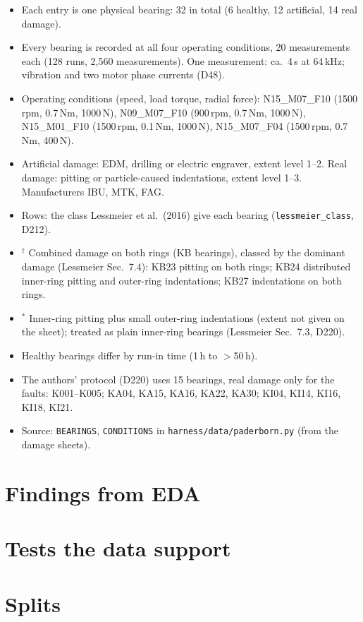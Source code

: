 \documentclass[11pt,a4paper]{article}
\begin{document}
\begin{itemize}
  \item Each entry is one physical bearing: 32 in total (6 healthy, 12 artificial, 14 real damage).
  \item Every bearing is recorded at all four operating conditions, 20 measurements each
        (128 runs, 2,560 measurements). One measurement: ca.\ 4\,s at 64\,kHz; vibration and
        two motor phase currents (D48).
  \item Operating conditions (speed, load torque, radial force):
        N15\_M07\_F10 (1500\,rpm, 0.7\,Nm, 1000\,N), N09\_M07\_F10 (900\,rpm, 0.7\,Nm, 1000\,N),
        N15\_M01\_F10 (1500\,rpm, 0.1\,Nm, 1000\,N), N15\_M07\_F04 (1500\,rpm, 0.7\,Nm, 400\,N).
  \item Artificial damage: EDM, drilling or electric engraver, extent level 1--2.
        Real damage: pitting or particle-caused indentations, extent level 1--3.
        Manufacturers IBU, MTK, FAG.
  \item Rows: the class Lessmeier et al.\ (2016) give each bearing (\texttt{lessmeier\_class}, D212).
  \item $^\dagger$ Combined damage on both rings (KB bearings), classed by the dominant damage
        (Lessmeier Sec.\ 7.4): KB23 pitting on both rings; KB24 distributed inner-ring pitting
        and outer-ring indentations; KB27 indentations on both rings.
  \item $^*$ Inner-ring pitting plus small outer-ring indentations (extent not given on the
        sheet); treated as plain inner-ring bearings (Lessmeier Sec.\ 7.3, D220).
  \item Healthy bearings differ by run-in time (1\,h to $>$50\,h).
  \item The authors' protocol (D220) uses 15 bearings, real damage only for the faults:
        K001--K005; KA04, KA15, KA16, KA22, KA30; KI04, KI14, KI16, KI18, KI21.
  \item Source: \texttt{BEARINGS}, \texttt{CONDITIONS} in \texttt{harness/data/paderborn.py}
        (from the damage sheets).
\end{itemize}

\section{Findings from EDA}

\section{Tests the data support}

\section{Splits}
\end{document}
